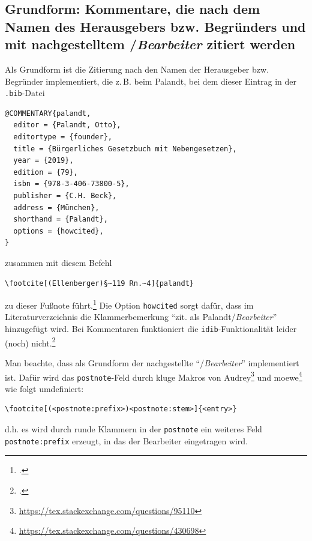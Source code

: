 \documentclass[headings=small,numbers=noenddot, 12pt,oneside]{scrartcl}
\newcommand\fnurl[1]{\footnote{\url{#1}}}
\begin{document}
\subsection{Grundform: Kommentare, die nach dem Namen des Herausgebers bzw. Begründers und mit nachgestelltem \slash\emph{Bearbeiter} zitiert werden}
Als Grundform ist die Zitierung nach den Namen der Herausgeber bzw. Begründer implementiert, die z.\,B. beim Palandt, bei dem dieser Eintrag in der \texttt{.bib}-Datei 
\begin{verbatim}
@COMMENTARY{palandt,
  editor = {Palandt, Otto},
  editortype = {founder},
  title = {Bürgerliches Gesetzbuch mit Nebengesetzen},
  year = {2019},
  edition = {79},
  isbn = {978-3-406-73800-5},
  publisher = {C.H. Beck},
  address = {München},
  shorthand = {Palandt},
  options = {howcited},
}
\end{verbatim}
zusammen mit diesem Befehl
\begin{verbatim}
\footcite[(Ellenberger)§~119 Rn.~4]{palandt}
\end{verbatim}
zu dieser Fußnote führt.\footcite[(Ellenberger)§~119 Rn.~4]{palandt} Die Option \texttt{howcited} sorgt dafür, dass im Literaturverzeichnis die Klammerbemerkung \enquote{zit. als Palandt\slash\emph{Bearbeiter}} hinzugefügt wird. Bei Kommentaren funktioniert die \texttt{idib}-Funktionalität leider (noch) nicht.\footcite[(Ellenberger)§~119 Rn.~5]{palandt}

Man beachte, dass als Grundform der nachgestellte  \enquote{\slash\emph{Bearbeiter}} implementiert ist. Dafür wird das \texttt{postnote}-Feld durch kluge Makros von Audrey\fnurl{https://tex.stackexchange.com/questions/95110} und moewe\fnurl{https://tex.stackexchange.com/questions/430698} wie folgt umdefiniert: 
\begin{verbatim}
\footcite[(<postnote:prefix>)<postnote:stem>]{<entry>}
\end{verbatim}
d.h. es wird durch runde Klammern in der \texttt{postnote} ein weiteres Feld \texttt{postnote:prefix} erzeugt, in das  der Bearbeiter eingetragen wird. 
\end{document}

